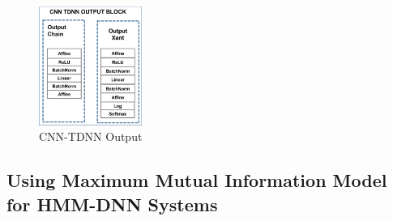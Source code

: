 \begin{figure}[h!]
    \centering
    \includegraphics[width=0.3\textwidth]{img/CNNTDNNOUTPUT.png}
    \caption{CNN-TDNN Output}
    \label{fig:CNNTDNN-output}
\end{figure}






\subsection{Using Maximum Mutual Information Model for HMM-DNN Systems}

